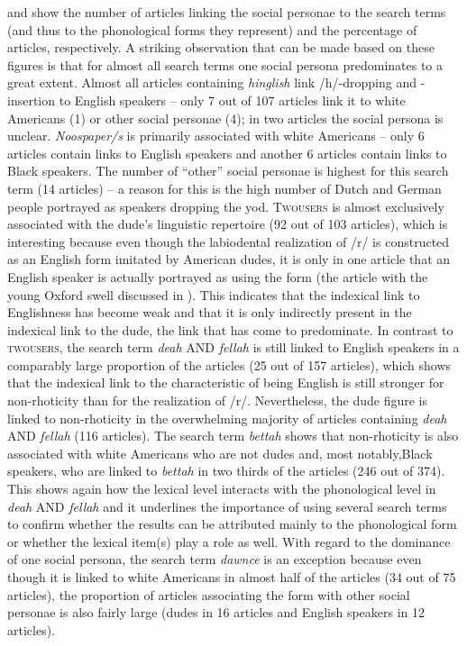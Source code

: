  and  show the number of articles linking the social personae to the search terms (and thus to the phonological forms they represent) and the percentage of articles, respectively. A striking observation that can be made based on these figures is that for almost all search terms one social persona predominates to a great extent. Almost all articles containing \emph{hinglish} link /h/-dropping and -insertion to English speakers – only 7 out of 107 articles link it to white Americans (1) or other social personae (4); in two articles the social persona is unclear. \emph{Noospaper/s} is primarily associated with white Americans – only 6 articles contain links to English speakers and another 6 articles contain links to Black speakers. The number of “other” social personae is highest for this search term (14 articles) – a reason for this is the high number of Dutch and German people portrayed as speakers dropping the yod. \textsc{Twousers} is almost exclusively associated with the dude’s linguistic repertoire (92 out of 103 articles), which is interesting because even though the labiodental realization of /r/ is constructed as an English form imitated by American dudes, it is only in one article that an English speaker is actually portrayed as using the form (the article with the young Oxford swell discussed in ). This indicates that the indexical link to Englishness has become weak and that it is only indirectly present in the indexical link to the dude, the link that has come to predominate. In contrast to \textsc{twousers}, the search term \emph{deah} AND \emph{fellah} is still linked to English speakers in a comparably large proportion of the articles (25 out of 157 articles), which shows that the indexical link to the characteristic of being English is still stronger for non-rhoticity than for the realization of /r/. Nevertheless, the dude figure is linked to non-rhoticity in the overwhelming majority of articles containing \emph{deah} AND \emph{fellah} (116 articles). The search term \emph{bettah} shows that non-rhoticity is also associated with white Americans who are not dudes and, most notably,Black speakers, who are linked to \emph{bettah} in two thirds of the articles (246 out of 374). This shows again how the lexical level interacts with the phonological level in \emph{deah} AND \emph{fellah} and it underlines the importance of using several search terms to confirm whether the results can be attributed mainly to the phonological form or whether the lexical item(s) play a role as well. With regard to the dominance of one social persona, the search term \emph{dawnce} is an exception because even though it is linked to white Americans in almost half of the articles (34 out of 75 articles), the proportion of articles associating the form with other social personae is also fairly large (dudes in 16 articles and English speakers in 12 articles).




